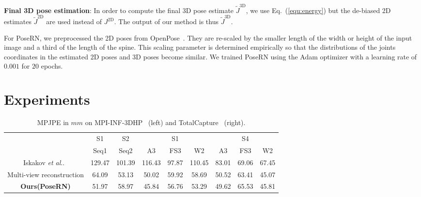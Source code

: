 \documentclass{article}
\makeatletter
\DeclareRobustCommand\onedot{\futurelet\@let@token\@onedot}
\def\@onedot{\ifx\@let@token.\else.\null\fi\xspace}
\def\etal{\emph{et al}\onedot}
\makeatother
\begin{document}
\textbf{Final 3D pose estimation}:
In order to compute the final 3D pose estimate $\tilde{J}^\text{3D}$, we use Eq.~(\ref{equ:energy}) but the de-biased 2D estimates $\tilde{J}^\text{2D}$ are used instead of $J^\text{2D}$. The output of our method is thus $\tilde{J}^\text{3D}$.

For PoseRN, we preprocessed the 2D poses from OpenPose~\cite{cao2018openpose}. They are re-scaled by the smaller length of the width or height of the input image and a third of the length of the spine. This scaling parameter is determined empirically so that the distributions of the joints coordinates in the estimated 2D poses and 3D poses become similar. We trained PoseRN using the Adam optimizer
with a learning rate of $0.001$ for $20$ epochs. 

\vspace{-0.2cm}
\section{Experiments}
\vspace{-0.2cm}
\begin{table*}[t]
    \centering
    \caption{MPJPE in $mm$ on MPI-INF-3DHP~\cite{mono-3dhp2017} (left) and TotalCapture~\cite{Trumble:BMVC:2017} (right).}
    \vspace{-0.3cm}
    \begin{tabular}{ccccccccc}
        \toprule
        & S1 & S2 & \multicolumn{3}{c}{S1} & \multicolumn{3}{c}{S4} \\
        \cmidrule(lr){2-2}\cmidrule(lr){3-3}\cmidrule(lr){4-6}\cmidrule(lr){7-9}
        & Seq1 & Seq2 & A3 & FS3 & W2 & A3 & FS3 & W2 \\
        \midrule
        Iskakov \etal~\cite{iskakov2019learnable} & 129.47 & 101.39 & 116.43 & 97.87 & 110.45 & 83.01 & 69.06 & 67.45\\
        Multi-view reconstruction & 64.09 & 53.13 & 50.02 & 59.92 & 58.69 & 50.52 & 63.41 & 45.07\\
        \textbf{Ours(PoseRN)} & 51.97 & 58.97 & 45.84 & 56.76 & 53.29 & 49.62 & 65.53 & 45.81\\
        \bottomrule
    \end{tabular}
    \label{tab:mpi-inf-3dhp}
\vspace{-.2cm}
\end{table*}
\end{document}
